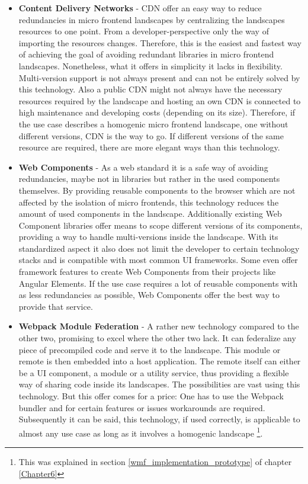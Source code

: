 \begin{itemize}
	\item \textbf{Content Delivery Networks} - CDN offer an easy way to reduce redundancies in micro frontend landscapes by centralizing the landscapes resources to one point. From a developer-perspective only the way of importing the resources changes. Therefore, this is the easiest and fastest way of achieving the goal of avoiding redundant libraries in micro frontend landscapes. Nonetheless, what it offers in simplicity it lacks in flexibility. Multi-version support is not always present and can not be entirely solved by this technology. Also a public CDN might not always have the necessary resources required by the landscape and hosting an own CDN is connected to high maintenance and developing costs (depending on its size). Therefore, if the use case describes a homogenic micro frontend landscape, one without different versions, CDN is the way to go. If different versions of the same resource are required, there are more elegant ways than this technology.
	
	\item \textbf{Web Components} - As a web standard it is a safe way of avoiding redundancies, maybe not in libraries but rather in the used components themselves. By providing reusable components to the browser which are not affected by the isolation of micro frontends, this technology reduces the amount of used components in the landscape. Additionally existing Web Component libraries offer means to scope different versions of its components, providing a way to handle multi-versions inside the landscape. With its standardized aspect it also does not limit the developer to certain technology stacks and is compatible with most common UI frameworks. Some even offer framework features to create Web Components from their projects like Angular Elements. If the use case requires a lot of reusable components with as less redundancies as possible, Web Components offer the best way to provide that service.
	
	\item \textbf{Webpack Module Federation} - A rather new technology compared to the other two, promising to excel where the other two lack. It can federalize any piece of precompiled code and serve it to the landscape. This module or remote is then embedded into a host application. The remote itself can either be a UI component, a module or a utility service, thus providing a flexible way of sharing code inside its landscapes. The possibilities are vast using this technology. But this offer comes for a price: One has to use the Webpack bundler and for certain features or issues workarounds are required. 
	Subsequently it can be said, this technology, if used correctly, is applicable to almost any use case as long as it involves a homogenic landscape \footnote{This was explained in section \ref{wmf_implementation_prototype} of chapter \ref{Chapter6}}.
\end{itemize}

